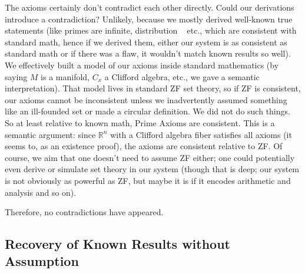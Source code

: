 \documentclass[11pt]{article}
\begin{document}
The axioms certainly don't contradict each other directly. Could our derivations introduce a contradiction? Unlikely, because we mostly derived well-known true statements (like primes are infinite, distribution ~ etc., which are consistent with standard math, hence if we derived them, either our system is as consistent as standard math or if there was a flaw, it wouldn't match known results so well).
We effectively built a model of our axioms inside standard mathematics (by saying $M$ is a manifold, $C_x$ a Clifford algebra, etc., we gave a semantic interpretation). That model lives in standard ZF set theory, so if ZF is consistent, our axioms cannot be inconsistent unless we inadvertently assumed something like an ill-founded set or made a circular definition. We did not do such things. So at least relative to known math, Prime Axioms are consistent. This is a semantic argument: since $\mathbb{R}^n$ with a Clifford algebra fiber satisfies all axioms (it seems to, as an existence proof), the axioms are consistent relative to ZF. Of course, we aim that one doesn't need to assume ZF either; one could potentially even derive or simulate set theory in our system (though that is deep; our system is not obviously as powerful as ZF, but maybe it is if it encodes arithmetic and analysis and so on).

Therefore, no contradictions have appeared.

\subsection*{Recovery of Known Results without Assumption}
\end{document}
